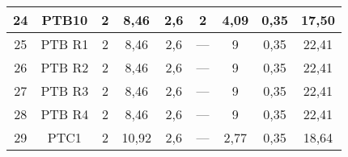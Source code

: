 \begin{table}[h!]
\begin{tabular}{|c|c|c|c|c|c|c|c|c|}
	24                 & PTB10              & 2                                                    & 8,46                                        & 2,6                                           & 2                                             & 4,09                                             & 0,35                                            & 17,50                                                             \\ \hline
	25                 & PTB R1             & 2                                                    & 8,46                                        & 2,6                                           & ---                                           & 9                                                & 0,35                                            & 22,41                                                             \\ \hline
	26                 & PTB R2             & 2                                                    & 8,46                                        & 2,6                                           & ---                                           & 9                                                & 0,35                                            & 22,41                                                             \\ \hline
	27                 & PTB R3             & 2                                                    & 8,46                                        & 2,6                                           & ---                                           & 9                                                & 0,35                                            & 22,41                                                             \\ \hline
	28                 & PTB R4             & 2                                                    & 8,46                                        & 2,6                                           & ---                                           & 9                                                & 0,35                                            & 22,41                                                             \\ \hline
	29                 & PTC1               & 2                                                    & 10,92                                       & 2,6                                           & ---                                           & 2,77                                             & 0,35                                            & 18,64                                                             \\ \hline

\end{tabular}
\end{table}
